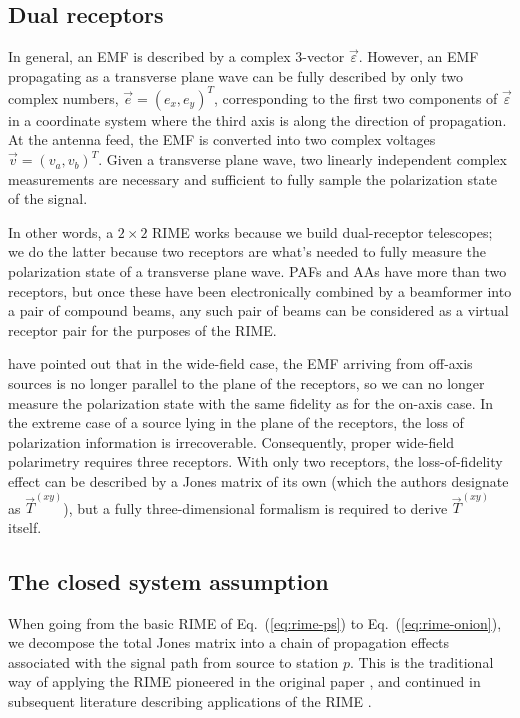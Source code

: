 \documentclass[]{aa}
\newcommand{\jones}[2]{\vec {#1}_{#2}}
\newcommand{\EDIT}[1]{#1}
\begin{document}
\subsection{Dual receptors}

\EDIT{In general, an EMF is described by a complex 3-vector $\vec\varepsilon$. However, an EMF propagating as a transverse plane wave can be fully described by only two complex numbers, $\vec e=(e_x,e_y)^T$, corresponding to the first two components of $\vec\varepsilon$ in a coordinate system where the third axis is along the direction of propagation. At the antenna feed, the EMF is converted into two complex voltages $\vec v=(v_a,v_b)^T$. Given a transverse plane wave, two linearly independent complex measurements are necessary and sufficient to fully sample the polarization state of the signal. 

In other words, a $2\times2$ RIME works because we build dual-receptor telescopes; we do the latter because two receptors are what's needed to fully measure the polarization state of a transverse plane wave. PAFs and AAs have more than two receptors, but once these have been electronically combined by a beamformer into a pair of compound beams, any such pair of beams can be considered as a virtual receptor pair for the purposes of the RIME.

\citet{Carozzi:ME3D} have pointed out that in the wide-field case, the EMF arriving from off-axis sources is no longer parallel to the plane of the receptors, so we can no longer measure the polarization state with the same fidelity as for the on-axis case. In the extreme case of a source lying in the plane of the receptors, the loss of polarization information is irrecoverable. Consequently, proper wide-field polarimetry requires three receptors. With only two receptors, the loss-of-fidelity effect can be described by a Jones matrix of its own (which the authors designate as $\jones{T}{}^{(xy)}$), but a fully three-dimensional formalism is required to derive $\jones{T}{}^{(xy)}$ itself.}

\subsection{The closed system assumption}
\label{sec:closed-sys-assumption}

When going from the basic RIME of Eq.~(\ref{eq:rime-ps}) to Eq.~(\ref{eq:rime-onion}), we decompose the total Jones matrix into a chain of propagation effects associated with the signal path from source to station $p$. This is the traditional way of applying the RIME pioneered in the original paper \citep{ME1}, and continued in subsequent literature describing applications of the RIME \citep{JEN:note185,Rau:DDEs,CASA:UserRef,RRIME1}.
\end{document}
